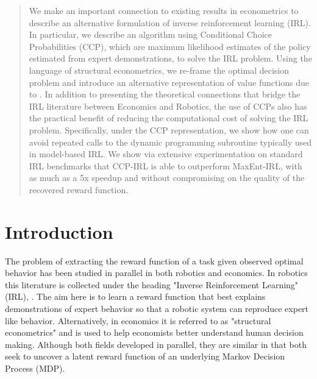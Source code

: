 \documentclass{article}
\begin{document}
\begin{abstract}
We make an important connection to existing results in econometrics to describe an alternative formulation of inverse reinforcement learning (IRL). In particular, we describe an algorithm using Conditional Choice Probabilities (CCP), which are maximum likelihood estimates of the policy estimated from expert demonstrations, to solve the IRL problem. Using the language of structural econometrics, we re-frame the optimal decision problem and introduce an alternative representation of value functions due to \cite{hotz}. In addition to presenting the theoretical connections that bridge the IRL literature between Economics and Robotics, the use of CCPs also has the practical benefit of reducing the computational cost of solving the IRL problem. Specifically, under the CCP representation, we show how one can avoid repeated calls to the dynamic programming subroutine typically used in model-based IRL. We show via extensive experimentation on standard IRL benchmarks that CCP-IRL is able to outperform MaxEnt-IRL, with as much as a 5x speedup and without compromising on the quality of the recovered reward function.
\end{abstract} 

\section{Introduction}

The problem of extracting the reward function of a task given observed optimal behavior has been studied in parallel in both robotics and economics. In robotics this literature is collected under the heading "Inverse Reinforcement Learning" (IRL), \cite{Ng2000, abbeel2004apprenticeship}. The aim here is to learn a reward function that best explains demonstrations of expert behavior so that a robotic system can reproduce expert like behavior. Alternatively, in economics it is referred to as "structural econometrics" \cite{miller, pakes, rust_gmc} and is used to help economists better understand human decision making. Although both fields developed in parallel, they are similar in that both seek to uncover a latent reward function of an underlying Markov Decision Process (MDP).

\end{document}
